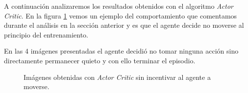A continuación analizaremos los resultados obtenidos con el algoritmo \textit{Actor Critic}. En la figura \ref{fig-resultados-experimentos-actor-critic-no-movement} vemos un ejemplo del comportamiento que comentamos durante el análisis en la sección anterior y es que el agente decide no moverse al principio del entrenamiento.
\medskip

En las 4 imágenes presentadas el agente decidió no tomar ninguna acción sino directamente permanecer quieto y con ello terminar el episodio.
\medskip

\begin{figure}[ht!]
    \centering
	\hspace{0.05\linewidth}
	\hspace{0.05\linewidth}
	\hspace{0.05\linewidth}
    \caption[Imágenes obtenidas con \textit{Actor Critic} sin incentivar al agente a moverse]{Imágenes obtenidas con \textit{Actor Critic} sin incentivar al agente a moverse.}
    \label{fig-resultados-experimentos-actor-critic-no-movement}
\end{figure}


